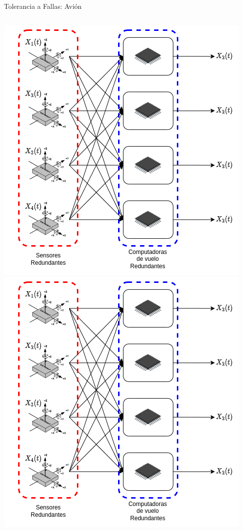 \begin{frame}{Tolerancia a Fallas: Avión}
\begin{columns}
\begin{overprint}
				\includegraphics[width=\textwidth]{img/adquieren_sensores_3.png}
				\onslide<6>\includegraphics[width=\textwidth]{img/adquieren_sensores_3.png}
			\end{overprint}
	\end{columns}
\end{frame}

